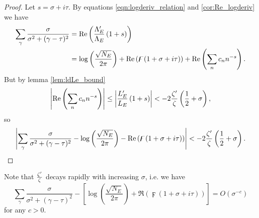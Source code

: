 \begin{proof}
Let $s = \sigma + i \tau$. By equations \ref{eqn:logderiv_relation} and \ref{cor:Re_logderiv} we have
\begin{align*}
\sum_{\gamma} \frac{\sigma}{\sigma^2+(\gamma-\tau)^2} &= \mbox{\rm Re}\left(\frac{\Lambda_E^{\prime}}{\Lambda_E}\left(1+s\right)\right) \\
&= \log\left(\frac{\sqrt{N_E}}{2\pi}\right) + \mbox{\rm Re}\left(\digamma(1+\sigma+i \tau)\right) + \mbox{\rm Re}\left(\sum_n c_n n^{-s}\right).
\end{align*}
But by lemma \ref{lem:ldLe_bound}
\begin{equation*}
\left|\mbox{\rm Re}\left(\sum_n c_n n^{-s}\right)\right| \le \left|\frac{L_E^{\prime}}{L_E}\left(1+s\right)\right| < - 2\frac{\zeta^{\prime}}{\zeta}\left(\frac{1}{2}+\sigma\right),
\end{equation*}
so
\begin{equation*}
\left|\sum_\gamma \frac{\sigma}{\sigma^2+(\gamma-\tau)^2} - \log\left(\frac{\sqrt{N_E}}{2\pi}\right) - \mbox{\rm Re}\left(\digamma(1+\sigma+i \tau)\right)\right| < - 2\frac{\zeta^{\prime}}{\zeta}\left(\frac{1}{2}+\sigma\right).
\end{equation*}
\end{proof}
Note that $\frac{\zeta^{\prime}}{\zeta}$ decays rapidly with increasing $\sigma$, i.e. we have
\begin{equation*}
\sum_\gamma \frac{\sigma}{\sigma^2+(\gamma-\tau)^2} - \left[\log\left(\frac{\sqrt{N_E}}{2\pi}\right) + \Re\left(\digamma(1+\sigma+i \tau)\right)\right] = O(\sigma^{-c})
\end{equation*}
for any $c>0$. \\

